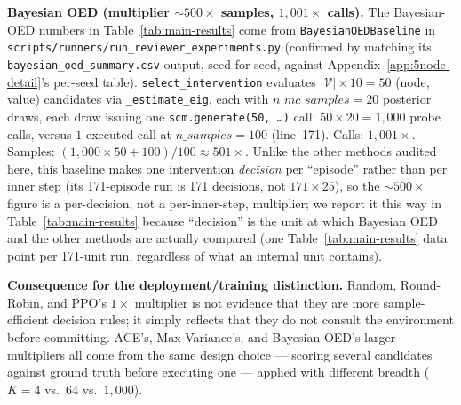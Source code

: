 \textbf{Bayesian OED (multiplier $\sim\!500\times$ samples, $1{,}001\times$ calls).} The Bayesian-OED numbers in Table~\ref{tab:main-results} come from \texttt{BayesianOEDBaseline} in \texttt{scripts/runners/run\_reviewer\_experiments.py} (confirmed by matching its \texttt{bayesian\_oed\_summary.csv} output, seed-for-seed, against Appendix~\ref{app:5node-detail}'s per-seed table). \texttt{select\_intervention} evaluates $|\mathcal V|\times10=50$ (node, value) candidates via \texttt{\_estimate\_eig}, each with $n\_mc\_samples{=}20$ posterior draws, each draw issuing one \texttt{scm.generate(50, \ldots)} call: $50\times20=1{,}000$ probe calls, versus $1$ executed call at $n\_samples=100$ (line~171). Calls: $1{,}001\times$. Samples: $(1{,}000\times50 + 100)/100 \approx 501\times$. Unlike the other methods audited here, this baseline makes one intervention \emph{decision} per ``episode'' rather than per inner step (its 171-episode run is 171 decisions, not $171\times25$), so the $\sim\!500\times$ figure is a per-decision, not a per-inner-step, multiplier; we report it this way in Table~\ref{tab:main-results} because ``decision'' is the unit at which Bayesian OED and the other methods are actually compared (one Table~\ref{tab:main-results} data point per 171-unit run, regardless of what an internal unit contains).

\textbf{Consequence for the deployment/training distinction.} Random, Round-Robin, and PPO's $1\times$ multiplier is not evidence that they are more sample-efficient decision rules; it simply reflects that they do not consult the environment before committing. ACE's, Max-Variance's, and Bayesian OED's larger multipliers all come from the same design choice --- scoring several candidates against ground truth before executing one --- applied with different breadth ($K{=}4$ vs.\ $64$ vs.\ $1{,}000$).

